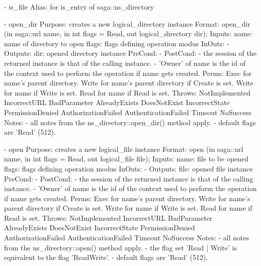 \begin{myspec}
 
    - is_file
      Alias:    for is_entry of saga::ns_directory
 
 
    - open_dir
      Purpose:  creates a new logical_directory instance
      Format:   open_dir         (in  saga::url name,
                                  in  int       flags = Read,
                                  out logical_directory dir);
      Inputs:   name:             name of directory to open
                flags:            flags defining operation
                                  modus
      InOuts:   -
      Outputs:  dir:              opened directory instance
      PreCond:  -
      PostCond: - the session of the returned instance is that of
                  the calling instance.
                - 'Owner' of name is the id of the context
                  used to perform the operation if name gets
                  created.
      Perms:    Exec  for name's parent directory.
                Write for name's parent directory if Create is set.
                Write for name if Write is set.
                Read  for name if Read  is set.
      Throws:   NotImplemented
                IncorrectURL
                BadParameter
                AlreadyExists
                DoesNotExist
                IncorrectState
                PermissionDenied
                AuthorizationFailed
                AuthenticationFailed
                Timeout
                NoSuccess
      Notes:    - all notes from the ns_directory::open_dir()
                  method apply.
                - default flags are 'Read' (512).
 
 
    - open
      Purpose:  creates a new logical_file instance
      Format:   open             (in  saga::url    name,
                                  in  int          flags = Read,
                                  out logical_file file);
      Inputs:   name:             file to be opened
                flags:            flags defining operation
                                  modus
      InOuts:   -
      Outputs:  file:             opened file instance
      PreCond:  -
      PostCond: - the session of the returned instance is that of
                  the calling instance.
                - 'Owner' of name is the id of the context
                  used to perform the operation if name gets
                  created.
      Perms:    Exec  for name's parent directory.
                Write for name's parent directory if Create is set.
                Write for name if Write is set.
                Read  for name if Read  is set.
      Throws:   NotImplemented
                IncorrectURL
                BadParameter
                AlreadyExists
                DoesNotExist
                IncorrectState
                PermissionDenied
                AuthorizationFailed
                AuthenticationFailed
                Timeout
                NoSuccess
      Notes:    - all notes from the ns_directory::open() method
                  apply.
                - the flag set 'Read | Write' is equivalent to
                  the flag 'ReadWrite'.
                - default flags are 'Read' (512).
 

\end{myspec}
